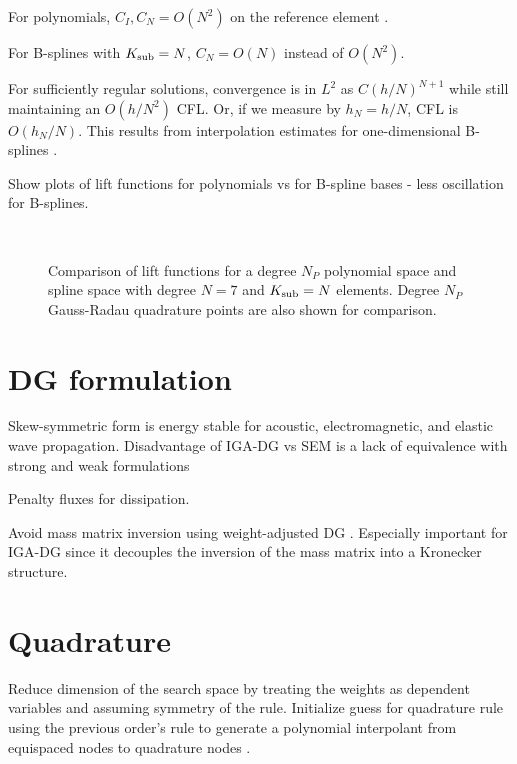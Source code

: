 \documentclass{siamart0216}
\newcommand{\Ksub}{K_{\rm sub}}
\begin{document}
For polynomials, $C_I, C_N = O(N^2)$ on the reference element .  

For B-splines with $K_{\rm sub} = N$, $C_N = O(N)$ instead of $O(N^2)$.  

For sufficiently regular solutions, convergence is in $L^2$ as $C (h/N)^{N+1}$ while still maintaining an $O(h/N^2)$ CFL.  Or, if we measure by $h_N = h/N$, CFL is $O(h_N/N)$.  This results from interpolation estimates for one-dimensional B-splines \cite{bazilevs2006isogeometric}.  

Show plots of lift functions for polynomials vs for B-spline bases - less oscillation for B-splines.  

\begin{figure}
\centering
\subfloat[$N_P = N+\Ksub$]{\texttt{[image: figs/lift1.png]}}
\\
\caption{Comparison of lift functions for a degree $N_P$ polynomial space and spline space with degree $N = 7$ and $\Ksub = N$ elements.  Degree $N_P$ Gauss-Radau quadrature points are also shown for comparison.  }
\end{figure}

\section{DG formulation}

Skew-symmetric form is energy stable for acoustic, electromagnetic, and elastic wave propagation.  Disadvantage of IGA-DG vs SEM is a lack of equivalence with strong and weak formulations \cite{kopriva2010quadrature}

Penalty fluxes \cite{chan2016short} for dissipation.  

Avoid mass matrix inversion using weight-adjusted DG \cite{chan2016weight1,chan2016weight2}.  Especially important for IGA-DG since it decouples the inversion of the mass matrix into a Kronecker structure.  

\section{Quadrature }

Reduce dimension of the search space by treating the weights as dependent variables and assuming symmetry of the rule.  Initialize guess for quadrature rule using the previous order's rule to generate a polynomial interpolant from equispaced nodes to quadrature nodes \cite{warburton2006explicit,chan2015comparison}.  
\end{document}
